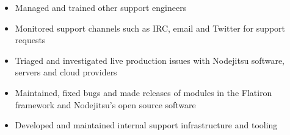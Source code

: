 \begin{itemize}
  \item Managed and trained other support engineers
  \item Monitored support channels such as IRC, email and Twitter for support
    requests
  \item Triaged and investigated live production issues with Nodejitsu software,
  servers and cloud providers
  \item Maintained, fixed bugs and made releases of modules in the Flatiron
    framework and Nodejitsu's open source software
  \item Developed and maintained internal support infrastructure and tooling
\end{itemize}
